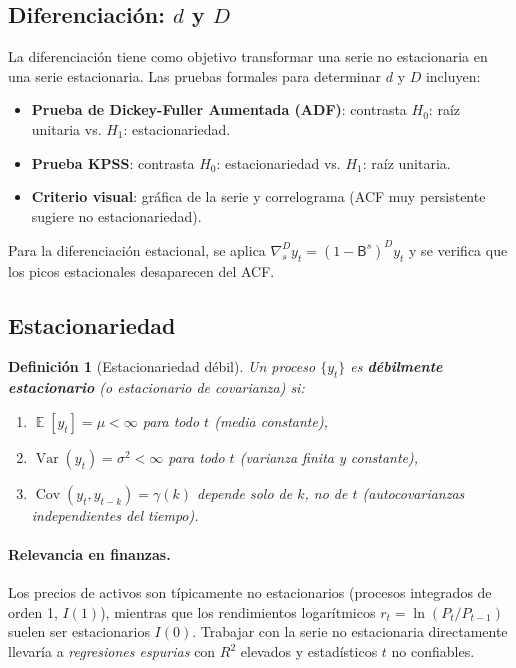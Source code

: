 \documentclass[12pt,a4paper]{article}
\newtheorem{definicion}{Definición}[section]
\DeclareMathOperator{\Cov}{Cov}
\DeclareMathOperator{\Var}{Var}
\DeclareMathOperator{\E}{\mathbb{E}}
\newcommand{\B}{\mathsf{B}}          %
\newcommand{\diff}{\nabla}           %
\begin{document}
\subsection{Diferenciación: $d$ y $D$}

La diferenciación tiene como objetivo transformar una serie no estacionaria en una serie
estacionaria. Las pruebas formales para determinar $d$ y $D$ incluyen:

\begin{itemize}
  \item \textbf{Prueba de Dickey-Fuller Aumentada (ADF)}: contrasta $H_0$: raíz unitaria vs.
        $H_1$: estacionariedad.
  \item \textbf{Prueba KPSS}: contrasta $H_0$: estacionariedad vs. $H_1$: raíz unitaria.
  \item \textbf{Criterio visual}: gráfica de la serie y correlograma (ACF muy persistente
        sugiere no estacionariedad).
\end{itemize}

Para la diferenciación estacional, se aplica $\diff_s^D y_t = (1 - \B^s)^D y_t$ y se verifica
que los picos estacionales desaparecen del ACF.

\subsection{Estacionariedad}

\begin{definicion}[Estacionariedad débil]
Un proceso $\{y_t\}$ es \textbf{débilmente estacionario} (o estacionario de covarianza) si:
\begin{enumerate}
  \item $\E[y_t] = \mu < \infty$ para todo $t$ (media constante),
  \item $\Var(y_t) = \sigma^2 < \infty$ para todo $t$ (varianza finita y constante),
  \item $\Cov(y_t, y_{t-k}) = \gamma(k)$ depende solo de $k$, no de $t$ (autocovarianzas
        independientes del tiempo).
\end{enumerate}
\end{definicion}

\paragraph{Relevancia en finanzas.}
Los precios de activos son típicamente no estacionarios (procesos integrados de orden 1,
$I(1)$), mientras que los rendimientos logarítmicos $r_t = \ln(P_t/P_{t-1})$ suelen ser
estacionarios $I(0)$. Trabajar con la serie no estacionaria directamente llevaría a
\textit{regresiones espurias} con $R^2$ elevados y estadísticos $t$ no confiables.
\end{document}
